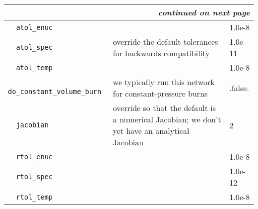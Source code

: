 \begin{landscape}
{\begin{center}
\begin{longtable}{|l|p{5.25in}|l|}
\multicolumn{3}{|r|}{{\em continued on next page}} \\ \hline
\endfoot

\hline 
\endlastfoot


\rowcolor{tableShade}
\verb=  atol_enuc  = &    &  1.0e-8 \\
\verb=  atol_spec  = &   override the default tolerances for backwards compatibility  &  1.0e-11 \\
\rowcolor{tableShade}
\verb=  atol_temp  = &    &  1.0e-8 \\
\verb=  do_constant_volume_burn  = &   we typically run this network for constant-pressure burns  &  .false. \\
\rowcolor{tableShade}
\verb=  jacobian  = &   override so that the default is a numerical Jacobian; we don't yet have an analytical Jacobian  &  2 \\
\verb=  rtol_enuc  = &    &  1.0e-8 \\
\rowcolor{tableShade}
\verb=  rtol_spec  = &    &  1.0e-12 \\
\verb=  rtol_temp  = &    &  1.0e-8 \\


\end{longtable}
\end{center}

} %


\end{landscape}

%


